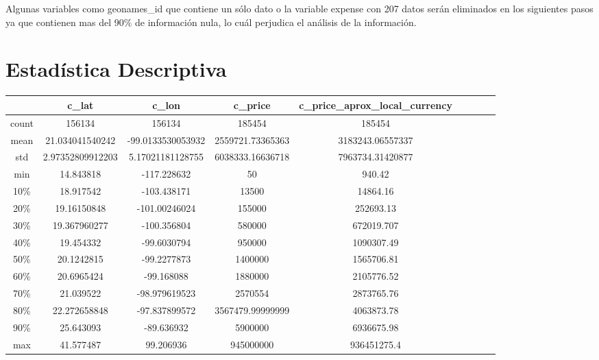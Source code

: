\documentclass{report}
\begin{document}
    Algunas variables como geonames\_id que contiene un sólo dato o la variable expense con 207 datos serán eliminados en los siguientes pasos ya que contienen mas del 90\% de información nula, lo cuál perjudica el análisis de la información.
    
    \section{Estadística Descriptiva}
    \begin{center}
    \begin{tabular}{||c|c|c|c|c|c|c|c|c||}
    \hline
    & c\_lat           & c\_lon            & c\_price         & c\_price\_aprox\_local\_currency \\
    \hline\hline
    count & 156134           & 156134            & 185454           & 185454                           \\
    mean  & 21.034041540242  & -99.0133530053932 & 2559721.73365363 & 3183243.06557337                 \\
    std   & 2.97352809912203 & 5.17021181128755  & 6038333.16636718 & 7963734.31420877                 \\
    min   & 14.843818        & -117.228632       & 50               & 940.42                           \\
    10\%  & 18.917542        & -103.438171       & 13500            & 14864.16                         \\
    20\%  & 19.16150848      & -101.00246024     & 155000           & 252693.13                        \\
    30\%  & 19.367960277     & -100.356804       & 580000           & 672019.707                       \\
    40\%  & 19.454332        & -99.6030794       & 950000           & 1090307.49                       \\
    50\%  & 20.1242815       & -99.2277873       & 1400000          & 1565706.81                       \\
    60\%  & 20.6965424       & -99.168088        & 1880000          & 2105776.52                       \\
    70\%  & 21.039522        & -98.979619523     & 2570554          & 2873765.76                       \\
    80\%  & 22.272658848     & -97.837899572     & 3567479.99999999 & 4063873.78                       \\
    90\%  & 25.643093        & -89.636932        & 5900000          & 6936675.98                       \\
    max   & 41.577487        & 99.206936         & 945000000        & 936451275.4      \\                   
    \hline
    \end{tabular}
    \end{center}
\end{document}
